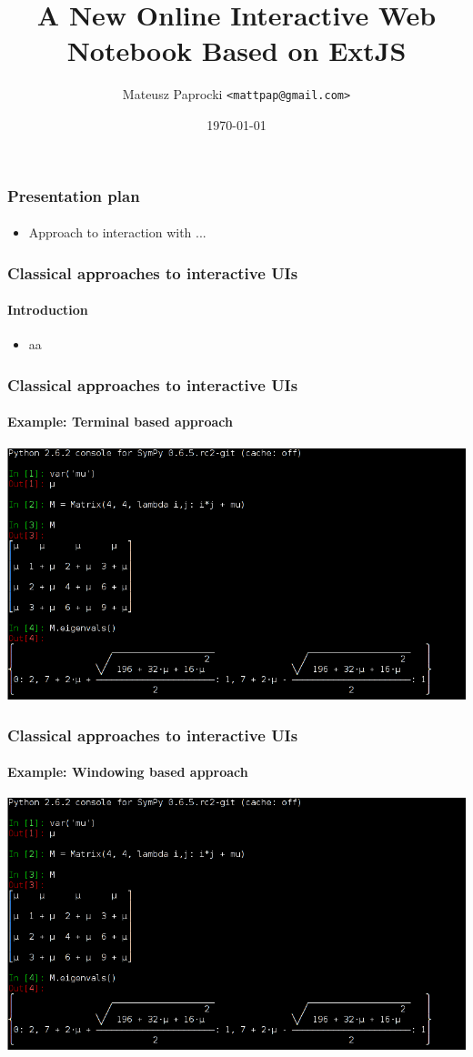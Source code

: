 \documentclass{beamer}
\title{A New Online Interactive Web Notebook Based on ExtJS}
\author{Mateusz Paprocki \texttt{<mattpap@gmail.com>}}
\institute[PWR]{Wrocław University of Technology}
\date{\today}
\begin{document}
\frame{\titlepage}

\begin{frame}
    \frametitle{Presentation plan}
    \framesubtitle{}

    \begin{itemize}
        \item Approach to interaction with ...
    \end{itemize}
\end{frame}

\begin{frame}
    \frametitle{Classical approaches to interactive UIs}
    \framesubtitle{Introduction}

    \begin{itemize}
        \item aa
    \end{itemize}
\end{frame}

\begin{frame}
    \frametitle{Classical approaches to interactive UIs}
    \framesubtitle{Example: Terminal based approach}

    \begin{center}
        \includegraphics[scale=0.65]{images/sympy-unicode.png}
    \end{center}
\end{frame}

\begin{frame}
    \frametitle{Classical approaches to interactive UIs}
    \framesubtitle{Example: Windowing based approach}

    \begin{center}
        \includegraphics[scale=0.65]{images/sympy-unicode.png}
    \end{center}
\end{frame}
\end{document}
